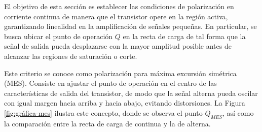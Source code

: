 \documentclass[chaptersright]{informeutn}
\begin{document}
El objetivo de esta sección es establecer las condiciones de polarización en corriente continua de 
manera que el transistor opere en la región activa, garantizando linealidad en la 
amplificación de señales pequeñas. En particular, se busca ubicar el punto de operación $Q$ 
en la recta de carga de tal forma que la señal de salida pueda desplazarse con la mayor 
amplitud posible antes de alcanzar las regiones de saturación o corte.

Este criterio se conoce como polarización para máxima excursión simétrica (MES). Consiste 
en ajustar el punto de operación en el centro de las características de salida del transistor, 
de modo que la señal alterna pueda oscilar con igual margen hacia arriba y hacia abajo, 
evitando distorsiones. La Figura \ref{fig:gráfica-mes} ilustra este concepto, donde se observa el punto 
$Q_{MES}$, así como la comparación entre la recta de carga de continua y la de alterna.
\end{document}
